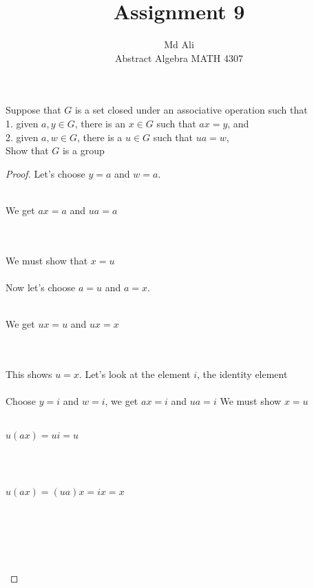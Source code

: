 \documentclass[12pt]{article}
\newenvironment{problem}[2][Problem]{\begin{trivlist}
\item[\hskip \labelsep {\bfseries #1}\hskip \labelsep {\bfseries #2.}]}{\end{trivlist}}
\begin{document}
 
 
\title{Assignment 9}%
\author{Md Ali\\ %
Abstract Algebra MATH 4307} %
 
\maketitle
 
\begin{problem}{2.2.1} %
Suppose that $G$ is a set closed under an associative operation such that \\ 
1. given $a,y \in G$, there is an $x \in G$ such that $ax = y$, and \\ 
2. given $a,w \in G$, there is a $u \in G$ such that $ua = w$, \\
Show that $G$ is a group
\end{problem}
 
\begin{proof}
Let's choose $y=a$ and $w=a$. \\ \\
\centerline{We get $ax=a$ and $ua=a$} \\ \\
We must show that $x=u$ \\ \\
Now let's choose $a=u$ and $a=x$. \\ \\
\centerline{We get $ux=u$ and $ux=x$} \\ \\
This shows $u=x$. Let's look at the element $i$, the identity element \\ \\
Choose $y=i$ and $w=i$, we get $ax=i$ and $ua=i$ We must show $x=u$ \\ \\
\centerline{$u(ax)=ui=u$} \\ \\
\centerline{$u(ax) = (ua)x = ix = x$} \\ \\
\centerline{} \\ \\
\end{proof}
\end{document}
